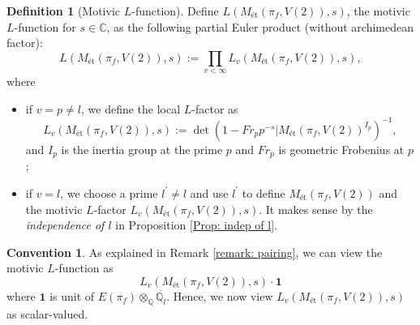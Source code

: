 \documentclass[11pt, a4paper]{amsart}
\theoremstyle{plain}
\theoremstyle{definition}
\newtheorem{definition}[theorem]{Definition}
\newtheorem{convention}[theorem]{Convention}
\numberwithin{equation}{section}
\def\CC{\mathbb{C}}
\def\QQ{\mathbb{Q}}
\DeclareMathOperator{\Gal}{Gal}
\begin{document}
\begin{definition}[Motivic $L$-function]
\label{Def: mot L-function}
    Define $L(M_{\text{\'{e}t}}(\pi_{f}, V(2)), s)$, the motivic $L$-function for $s \in \CC$, as the following partial Euler product (without archimedean factor): 
    \begin{equation*}
        L(M_{\text{\'{e}t}}(\pi_{f}, V(2)), s) := \prod_{v < \infty} L_{v}(M_{\text{\'{e}t}}(\pi_{f}, V(2)), s), 
    \end{equation*}
    where 
    \begin{itemize}
        \item if $v = p \neq l$, we define the local $L$-factor as 
              \begin{equation*}
                  L_{v}(M_{\text{\'{e}t}}(\pi_{f}, V(2)), s) := \det(1 - Fr_{p} p^{-s} | M_{\text{\'{e}t}}(\pi_{f}, V(2))^{I_{p}})^{-1}, 
              \end{equation*}
              and $I_{p}$ is the inertia group at the prime $p$ and $Fr_{p}$ is geometric Frobenius at $p$; 
        \item if $v = l$, we choose a prime $l^{\prime} \neq l$ and use $l^{\prime}$ to define $M_{\text{\'{e}t}}(\pi_{f}, V(2))$ and the motivic $L$-factor $L_{v}(M_{\text{\'{e}t}}(\pi_{f}, V(2)), s)$. It makes sense by the \textit{independence of $l$} in Proposition \ref{Prop: indep of l}. 
    \end{itemize}
\end{definition}

\begin{convention}
    As explained in Remark \ref{remark: pairing}, we can view the motivic $L$-function as 
    \begin{equation*}
        L_{v}(M_{\text{\'{e}t}}(\pi_{f}, V(2)), s) \cdot \mathbf{1}
    \end{equation*}
    where $\mathbf{1}$ is unit of $E(\pi_f) \otimes_{\QQ} \overline{\QQ_{l}}$. Hence, we now view $L_{v}(M_{\text{\'{e}t}}(\pi_{f}, V(2)), s)$ as scalar-valued. 
\end{convention}
\end{document}
